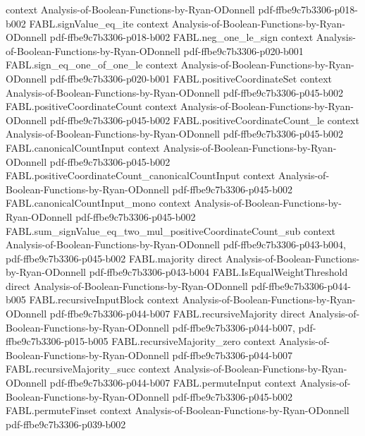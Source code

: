 \begin{theorem}
  {context}
  {Analysis-of-Boolean-Functions-by-Ryan-ODonnell}
  {pdf-ffbe9c7b3306-p018-b002}
\proofstep
  {FABL.signValue_eq_ite}
  {context}
  {Analysis-of-Boolean-Functions-by-Ryan-ODonnell}
  {pdf-ffbe9c7b3306-p018-b002}
\proofstep
  {FABL.neg_one_le_sign}
  {context}
  {Analysis-of-Boolean-Functions-by-Ryan-ODonnell}
  {pdf-ffbe9c7b3306-p020-b001}
\proofstep
  {FABL.sign_eq_one_of_one_le}
  {context}
  {Analysis-of-Boolean-Functions-by-Ryan-ODonnell}
  {pdf-ffbe9c7b3306-p020-b001}
\proofstep
  {FABL.positiveCoordinateSet}
  {context}
  {Analysis-of-Boolean-Functions-by-Ryan-ODonnell}
  {pdf-ffbe9c7b3306-p045-b002}
\proofstep
  {FABL.positiveCoordinateCount}
  {context}
  {Analysis-of-Boolean-Functions-by-Ryan-ODonnell}
  {pdf-ffbe9c7b3306-p045-b002}
\proofstep
  {FABL.positiveCoordinateCount_le}
  {context}
  {Analysis-of-Boolean-Functions-by-Ryan-ODonnell}
  {pdf-ffbe9c7b3306-p045-b002}
\proofstep
  {FABL.canonicalCountInput}
  {context}
  {Analysis-of-Boolean-Functions-by-Ryan-ODonnell}
  {pdf-ffbe9c7b3306-p045-b002}
\proofstep
  {FABL.positiveCoordinateCount_canonicalCountInput}
  {context}
  {Analysis-of-Boolean-Functions-by-Ryan-ODonnell}
  {pdf-ffbe9c7b3306-p045-b002}
\proofstep
  {FABL.canonicalCountInput_mono}
  {context}
  {Analysis-of-Boolean-Functions-by-Ryan-ODonnell}
  {pdf-ffbe9c7b3306-p045-b002}
\proofstep
  {FABL.sum_signValue_eq_two_mul_positiveCoordinateCount_sub}
  {context}
  {Analysis-of-Boolean-Functions-by-Ryan-ODonnell}
  {pdf-ffbe9c7b3306-p043-b004,
    pdf-ffbe9c7b3306-p045-b002}
\proofstep
  {FABL.majority}
  {direct}
  {Analysis-of-Boolean-Functions-by-Ryan-ODonnell}
  {pdf-ffbe9c7b3306-p043-b004}
\proofstep
  {FABL.IsEqualWeightThreshold}
  {direct}
  {Analysis-of-Boolean-Functions-by-Ryan-ODonnell}
  {pdf-ffbe9c7b3306-p044-b005}
\proofstep
  {FABL.recursiveInputBlock}
  {context}
  {Analysis-of-Boolean-Functions-by-Ryan-ODonnell}
  {pdf-ffbe9c7b3306-p044-b007}
\proofstep
  {FABL.recursiveMajority}
  {direct}
  {Analysis-of-Boolean-Functions-by-Ryan-ODonnell}
  {pdf-ffbe9c7b3306-p044-b007,
    pdf-ffbe9c7b3306-p015-b005}
\proofstep
  {FABL.recursiveMajority_zero}
  {context}
  {Analysis-of-Boolean-Functions-by-Ryan-ODonnell}
  {pdf-ffbe9c7b3306-p044-b007}
\proofstep
  {FABL.recursiveMajority_succ}
  {context}
  {Analysis-of-Boolean-Functions-by-Ryan-ODonnell}
  {pdf-ffbe9c7b3306-p044-b007}
\proofstep
  {FABL.permuteInput}
  {context}
  {Analysis-of-Boolean-Functions-by-Ryan-ODonnell}
  {pdf-ffbe9c7b3306-p045-b002}
\proofstep
  {FABL.permuteFinset}
  {context}
  {Analysis-of-Boolean-Functions-by-Ryan-ODonnell}
  {pdf-ffbe9c7b3306-p039-b002}

\end{theorem}
